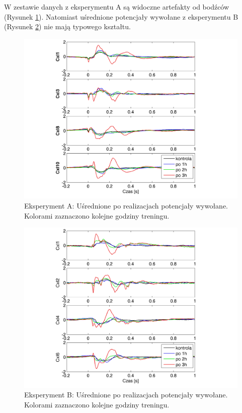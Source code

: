 \documentclass{pracamgr_2}
\begin{document}
	W zestawie danych z eksperymentu A są widoczne artefakty od bodźców (Rysunek \ref{rys:kontrola15_CxI}). Natomiast uśrednione potencjały wywołane z eksperymentu B (Rysunek \ref{rys:beta3_CxI}) nie mają typowego kształtu. 
	
	\begin{figure}[h]
		\begin{center}
			\includegraphics[scale=0.8]{kontrola15_CxI.png}
		\end{center}
		\caption{Eksperyment A: Uśrednione po realizacjach potencjały wywołane. Kolorami zaznaczono kolejne godziny treningu.}
		\label{rys:kontrola15_CxI}
	\end{figure}
	\FloatBarrier
	\begin{figure}[h]
		\begin{center}
			\includegraphics[scale=0.8]{beta3_CxI.png}
		\end{center}
		\caption{Eksperyment B: Uśrednione po realizacjach potencjały wywołane. Kolorami zaznaczono kolejne godziny treningu.}
		\label{rys:beta3_CxI}
	\end{figure}
\end{document}
